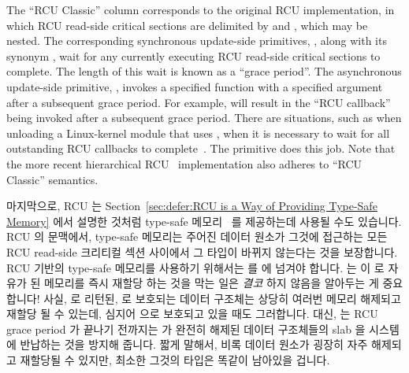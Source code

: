 The ``RCU Classic'' column corresponds to the original RCU implementation,
in which RCU read-side critical sections are delimited by
 and , which
may be nested.
The corresponding synchronous update-side primitives,
, along with its synonym
, wait for any currently executing
RCU read-side critical sections to complete.
The length of this wait is known as a ``grace period''.
The asynchronous update-side primitive, ,
invokes a specified function with a specified argument after a
subsequent grace period.
For example,  will result in
the ``RCU callback'' 
being invoked after a subsequent grace period.
There are situations,
such as when unloading a Linux-kernel module that uses ,
when it is necessary to wait for all
outstanding RCU callbacks to complete~\cite{PaulEMcKenney2007rcubarrier}.
The  primitive does this job.
Note that the more recent hierarchical
RCU~\cite{PaulEMcKenney2008HierarchicalRCU}
implementation also adheres to ``RCU Classic'' semantics.
\fi

마지막으로, RCU 는
Section~\ref{sec:defer:RCU is a Way of Providing Type-Safe Memory} 에서 설명한
것처럼 type-safe 메모리~\cite{Cheriton96a} 를 제공하는데 사용될 수도 있습니다.
RCU 의 문맥에서, type-safe 메모리는 주어진 데이터 원소가 그것에 접근하는 모든
RCU read-side 크리티컬 섹션 사이에서 그 타입이 바뀌지 않는다는 것을 보장합니다.
RCU 기반의 type-safe 메모리를 사용하기 위해서는  를
 에 넘겨야 합니다.
 는  이 
로 자유가 된 메모리를 즉시 재할당 하는 것을 막는 일은 \emph{결코} 하지 않음을
알아두는 게 중요합니다!
사실,  로 리턴된,  로 보호되는 데이터
구조체는 상당히 여러번 메모리 해제되고 재할당 될 수 있는데, 심지어
 으로 보호되고 있을 때도 그러합니다.
대신,  는 RCU grace period 가 끝나기 전까지는
 가 완전히 해제된 데이터 구조체들의 slab 을 시스템에
반납하는 것을 방지해 줍니다.
짧게 말해서, 비록 데이터 원소가 굉장히 자주 해제되고 재할당될 수 있지만, 최소한
그것의 타입은 똑같이 남아있을 겁니다.
\iffalse

